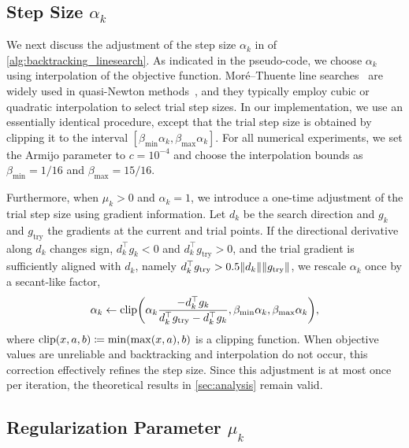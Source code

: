\documentclass[journal]{subfiles}
\begin{document}
\subsection{Step Size \texorpdfstring{$\alpha_k$}{alpha k}}\label{sec:proposed_choice_alpha}

We next discuss the adjustment of the step size $\alpha_k$ in  of \cref{alg:backtracking_linesearch}.
As indicated in the pseudo-code, we choose $\alpha_k$ using interpolation of the objective function.
Mor\'e--Thuente line searches~\citep{10.1145/192115.192132} are widely used in quasi-Newton methods~\citep{2020SciPy-NMeth}, and they typically employ cubic or quadratic interpolation to select trial step sizes.
In our implementation, we use an essentially identical procedure, except that the trial step size is obtained by clipping it to the interval $[\beta_{\min}\alpha_k, \beta_{\max}\alpha_k]$.
For all numerical experiments, we set the Armijo parameter to $c = 10^{-4}$ and choose the interpolation bounds as $\beta_{\min} = 1/16$ and $\beta_{\max} = 15/16$.

Furthermore, when $\mu_k>0$ and $\alpha_k=1$, we introduce a one-time adjustment of the trial step size using gradient information.
Let $d_k$ be the search direction and $g_k$ and $g_{\mathrm{try}}$ the gradients at the current and trial points.
If the directional derivative along $d_k$ changes sign, $d_k^\top g_k<0$ and $d_k^\top g_{\mathrm{try}}>0$, and the trial gradient is sufficiently aligned with $d_k$, namely $d_k^\top g_{\mathrm{try}}>0.5\norm{d_k}\norm{g_{\mathrm{try}}}$, we rescale $\alpha_k$ once by a secant-like factor,
\begin{equation*}
    \alpha_k \gets \mathrm{clip}\qty(\alpha_k \frac{-d_k^\top g_k}{d_k^\top g_{\mathrm{try}}-d_k^\top g_k},\beta_{\min}\alpha_k,\beta_{\max}\alpha_k),
\end{equation*}
where $\mathrm{clip}(x,a,b) \coloneqq \min(\max(x,a),b)$ is a clipping function.
When objective values are unreliable and backtracking and interpolation do not occur, this correction effectively refines the step size.
Since this adjustment is at most once per iteration, the theoretical results in \cref{sec:analysis} remain valid.

\subsection{Regularization Parameter \texorpdfstring{$\mu_k$}{mu k}}\label{sec:proposed_choice_mu}
\end{document}
